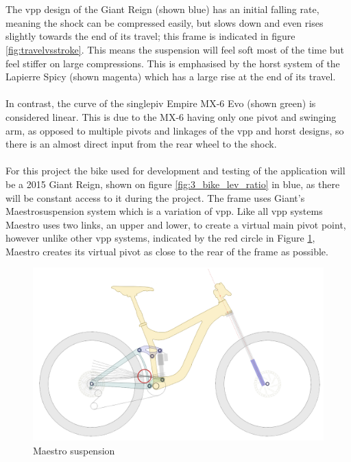 		\\\\
		The \gls{vpp} design of the Giant Reign (shown blue) has an initial falling rate, meaning the \gls{shock} can be compressed easily, but slows down and even rises slightly towards 
		the end of its travel; this frame is indicated in figure \ref{fig:travelvsstroke}. This 
		means the suspension will feel soft most of the time but feel stiffer on large 
		compressions. This is emphasised by the \gls{horst} system of the Lapierre Spicy (shown 
		magenta) which has a large rise at the end of its travel.
		\\\\
		In contrast, the curve of the \gls{singlepiv} Empire MX-6 Evo (shown green) is considered linear. This is due to the MX-6 having only one pivot and swinging arm, as opposed to multiple pivots and linkages of the \gls{vpp} and \gls{horst} designs, so there is an almost direct input from the rear wheel to the \gls{shock}.
		\\\\
		For this project the bike used for development and testing of the application will be a 2015 Giant Reign, shown on figure \ref{fig:3_bike_lev_ratio} in blue, as there will be constant access to it during the project. The frame uses Giant's Maestro\texttrademark  suspension system which is a variation of \gls{vpp}. Like all \gls{vpp} systems Maestro uses two links, an upper and lower, to create a virtual main pivot point, however unlike other \gls{vpp} systems, indicated by the red circle in Figure \ref{fig:maestro}, Maestro creates its virtual pivot as close to the rear of the frame as possible.
		\begin{figure}[h!]
			\centering
			\includegraphics[width=12cm]{../images/reignsch.PNG}
			\caption{Maestro suspension}
			\label{fig:maestro}
		\end{figure}
